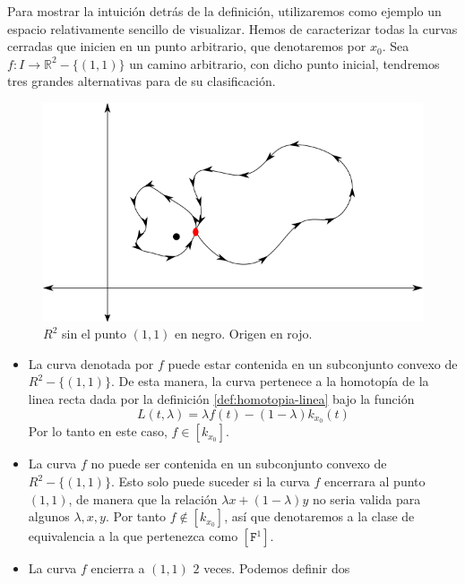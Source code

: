 {\begin{ejemplo} \label{ex:R2-11}
Para mostrar la intuición detrás de la definición, utilizaremos como
ejemplo un espacio relativamente sencillo de visualizar. Hemos de
caracterizar todas la curvas cerradas que inicien en un punto
arbitrario, que denotaremos por \(x_0\). Sea \(f : I \to \mathbb{R}^2 -
\{(1,1)\}\) un camino arbitrario, con dicho punto inicial, tendremos
tres grandes alternativas para de su clasificación.
\begin{figure}[h]
  \centering
  \includegraphics[scale=0.5]{./imagenes/R2-punto.png}
  \caption{\(R^2\) sin el punto \((1,1)\) en negro. Origen en rojo. }
  \label{fig:R2-sin-punto}
\end{figure}
\begin{itemize}
\item La curva denotada por \(f\) puede estar contenida en un subconjunto
  convexo de \(R^2 - \{(1,1)\}\). De esta manera, la curva pertenece a la
  homotopía de la linea recta dada por la definición
  \ref{def:homotopia-linea} bajo la función
  \[ L (t,\lambda) = \lambda f (t) - (1 - \lambda) k_{x_0} (t)\]
  Por lo tanto en este caso, \(f \in [k_{x_0}]\).
\item La curva \(f\) no puede ser contenida en un subconjunto convexo de
  \(R^2 - \{ (1,1)\}\). Esto solo puede suceder si la curva \(f\)
  encerrara al punto \((1,1)\), de manera que la relación \(\lambda x +
  (1 - \lambda) y\) no seria valida para algunos \(\lambda, x, y\). Por
  tanto \(f \not \in [k_{x_0}]\), así que denotaremos a la clase de
  equivalencia a la que pertenezca como \([\mathtt{F}^1]\).
\item La curva \(f\) encierra a \((1,1)\) \(2\) veces. Podemos definir dos

\end{itemize}
\end{ejemplo}}
